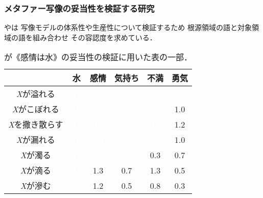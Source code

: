 \documentclass[12pt,usepdftitle=false]{beamer}
\begin{document}
\begin{frame}
    \frametitle{メタファー写像の妥当性を検証する研究}

	\citet{kuroda2005}や\citet{nabeshima2011}は
	写像モデルの体系性や生産性について検証するため
    根源領域の語と対象領域の語を組み合わせ
	その容認度を求めている．

    \begin{table}
        \footnotesize
        \setlength\extrarowheight{2pt}
        \begin{tabular}{|c|c|c|c|c|c|}
            \hline
            & 水 & 感情 & 気持ち & 不満 & 勇気 \\
            \hline
            \emph{X}が溢れる & \cellcolor{sDarkRed}\textcolor{white}{4.0} & \cellcolor{sDarkRed}\textcolor{white}{3.7} & \cellcolor{sDarkRed}\textcolor{white}{3.8} & \cellcolor{sDarkRed}\textcolor{white}{3.8} & \cellcolor{sDarkRed}\textcolor{white}{3.3} \\
            \hline
            \emph{X}がこぼれる & \cellcolor{sDarkRed}\textcolor{white}{4.0} & \cellcolor{sOrange}\textcolor{white}{2.5} & \cellcolor{sOrange}\textcolor{white}{2.7} & \cellcolor{sDarkRed}\textcolor{white}{3.2} & \cellcolor{sBlonde}1.0 \\
            \hline
            \emph{X}を撒き散らす & \cellcolor{sDarkRed}\textcolor{white}{3.8} &
\cellcolor{sDarkRed}\textcolor{white}{3.2}
            & \cellcolor{sOrange}\textcolor{white}{2.8} & \cellcolor{sDarkRed}\textcolor{white}{3.5} & \cellcolor{sBlonde}1.2 \\
            \hline
            \emph{X}が漏れる & \cellcolor{sDarkRed}\textcolor{white}{4.0} & \cellcolor{sDarkRed}\textcolor{white}{3.0} & \cellcolor{sBlonde}{1.3} & \cellcolor{sDarkRed}\textcolor{white}{3.8} & \cellcolor{sBlonde}1.0 \\
            \hline
            \emph{X}が濁る & \cellcolor{sDarkRed}\textcolor{white}{4.0} & \cellcolor{sOrange}\textcolor{white}{2.2} & \cellcolor{sOrange}\textcolor{white}{2.8} & 0.3 & 0.7 \\
            \hline
            \emph{X}が滴る & \cellcolor{sDarkRed}\textcolor{white}{3.3} & \cellcolor{sBlonde}1.3 & 0.7 & \cellcolor{sBlonde}1.3 & 0.5 \\
            \hline
            \emph{X}が滲む & \cellcolor{sBlonde}{1.8} & \cellcolor{sBlonde}1.2 & 0.5 & 0.8 & 0.3 \\
            \hline
        \end{tabular}
        \caption{\citet{nabeshima2011}が《感情は水》の妥当性の検証に用いた表の一部．}
    \end{table}
\end{frame}
\end{document}
